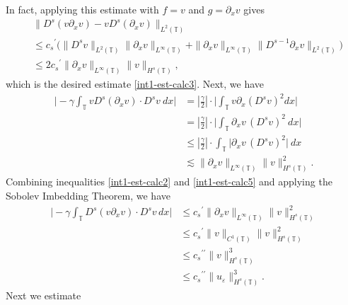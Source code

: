 \documentclass[12pt,reqno]{amsart}
\newcommand{\p}{\partial}
\newcommand{\ci}{\mathbb{T}}
\newcommand{\ee}{\varepsilon}
\theoremstyle{plain}  %
\theoremstyle{definition}
\begin{document}
\begin{appendices}
	In fact, applying  this estimate with $f=v$ and $g=\p_xv$ gives 
	\begin{equation} 
		\label{int1-est-calc4}
		\begin{split}
			& \| D^s(v\p_x v)  -  v D^s (\p_xv) \|_{L^2(\ci)}
			\\
			& \le
			{c_s}^\prime \big(
			\| D^{s}v \|_{L^2(\ci)}    \| \p_x v \|_{L^\infty(\ci)} 
			+
			\| \p_xv \|_{L^\infty(\ci)}    \| D^{s-1}\p_x v \|_{L^2(\ci)}   
			\big)
			\\
			& \le
			2{c_s}^\prime    \| \p_x v \|_{L^\infty(\ci)} 
			\| v \|_{H^s(\ci)}, 
		\end{split}
	\end{equation}
	which  is the desired estimate  \eqref{int1-est-calc3}.
	Next, we have
	\begin{equation} 
		\label{int1-est-calc5}
		\begin{split}
			\Big|
			-\gamma \int_\ci
			v D^s (\p_x v)
			\cdot  D^s v \ dx
			\Big|
			& =
			\left | \frac{\gamma}{2} \right | \cdot \Big|
			\int_\ci
			v \p_x\left(D^s v\right)^2  dx
			\Big|
			\\
			& =
			\left | \frac{\gamma}{2} \right | \cdot \Big | \int_\ci
			\p_x v \, (D^s v)^2 \ dx
			\Big|
			\\
			& \le
			\left | \frac{\gamma}{2} \right |  \cdot \int_\ci
			\Big | \p_x v \, (D^s v)^2   
			\Big| \ dx
			\\
			& \lesssim
			\| \p_x v \|_{L^\infty(\ci)} 
			\| v \|_{H^s(\ci)}^2.
		\end{split}
	\end{equation}
	Combining inequalities  \eqref{int1-est-calc2} and
	\eqref{int1-est-calc5} and applying the Sobolev Imbedding Theorem, we
	have
	\begin{equation} 
		\label{burgers_est'}
		\begin{split}
			\Big|
			-\gamma \int_\ci
			D^s(v \partial_x v) \cdot   D^s v \, dx  
			\Big|
			&\le
			{c_s}^\prime
			\| \p_x v \|_{L^\infty(\ci)} 
			\|  v \|_{H^s(\ci)}^2
			\\
			& \le {c_s}^\prime \| v \|_{C^1(\ci)} \| v \|_{H^s(\ci)}^2
			\\
			& \le {c_s}^{\prime \prime} \| v \|_{H^s(\ci)}^3
			\\
			& \le {c_s}^{\prime \prime} \| u_\ee \|_{H^s(\ci)}^3.
		\end{split}
	\end{equation}
	Next we estimate
	\begin{equation}

\end{equation}
\end{appendices}
\end{document}
